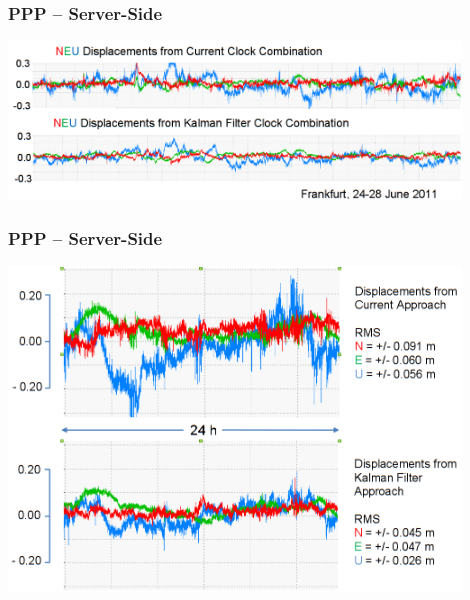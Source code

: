 \documentclass[10pt]{beamer}
\begin{document}

\begin{frame}
\frametitle{PPP -- Server-Side}
  \begin{center}
    \includegraphics[width=0.9\textwidth,angle=0]{combination_2.png}
  \end{center}
\end{frame}


\begin{frame}
\frametitle{PPP -- Server-Side}
  \begin{center}
    \includegraphics[width=0.9\textwidth,angle=0]{combination_3.png}
  \end{center}
\end{frame}

\end{document}
